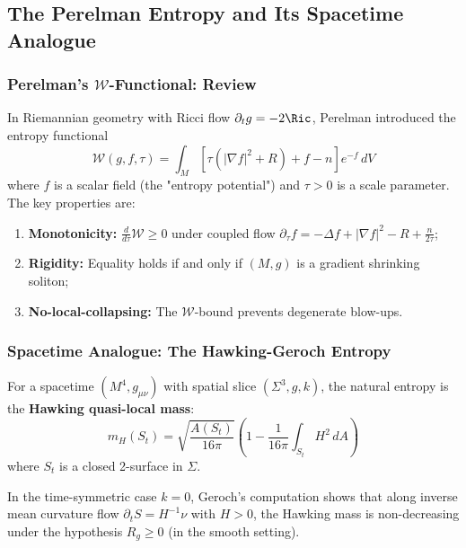 \subsection{The Perelman Entropy and Its Spacetime Analogue}

\subsubsection{Perelman's $\mathcal{W}$-Functional: Review}

In Riemannian geometry with Ricci flow $\partial_t g = -2\Ric$, Perelman introduced the entropy functional
\begin{equation}
\mathcal{W}(g, f, \tau) = \int_M \left[\tau\left(|\nabla f|^2 + R\right) + f - n\right]e^{-f} \, dV
\label{eq:perelman-W}
\end{equation}
where $f$ is a scalar field (the "entropy potential") and $\tau > 0$ is a scale parameter. The key properties are:
\begin{enumerate}[label=(\alph*)]
\item \textbf{Monotonicity:} $\frac{d}{d\tau}\mathcal{W} \geq 0$ under coupled flow $\partial_\tau f = -\Delta f + |\nabla f|^2 - R + \frac{n}{2\tau}$;
\item \textbf{Rigidity:} Equality holds if and only if $(M,g)$ is a gradient shrinking soliton;
\item \textbf{No-local-collapsing:} The $\mathcal{W}$-bound prevents degenerate blow-ups.
\end{enumerate}

\subsubsection{Spacetime Analogue: The Hawking-Geroch Entropy}

For a spacetime $(M^4, g_{\mu\nu})$ with spatial slice $(\Sigma^3, g, k)$, the natural entropy is the \textbf{Hawking quasi-local mass}:
\begin{equation}
m_H(S_t) 
= \sqrt{\frac{A(S_t)}{16\pi}}\left(1 - \frac{1}{16\pi}\int_{S_t} H^2 \, dA\right)
\label{eq:hawking-mass}
\end{equation}
where $S_t$ is a closed 2-surface in $\Sigma$.

\begin{proposition}
\label{prop:hawking-imcf}
In the time-symmetric case $k=0$, Geroch's computation shows that along inverse mean curvature flow $\partial_t S = H^{-1}\nu$ with $H>0$, the Hawking mass is non-decreasing under the hypothesis $R_g\ge 0$ (in the smooth setting).
\end{proposition}

